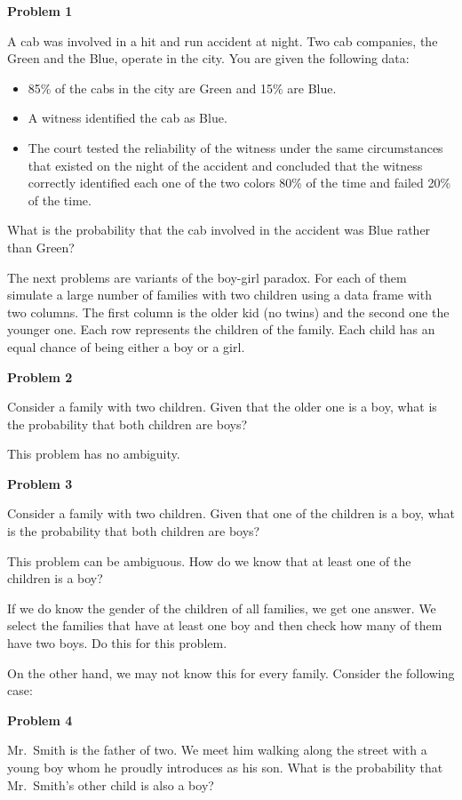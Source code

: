 \documentclass[
]{book}
\providecommand{\tightlist}{%
  \setlength{\itemsep}{0pt}\setlength{\parskip}{0pt}}
\theoremstyle{definition}
\theoremstyle{definition}
\theoremstyle{definition}
\theoremstyle{definition}
\theoremstyle{remark}
\begin{document}
\textbf{Problem 1}

A cab was involved in a hit and run accident at night. Two cab companies, the Green and the Blue, operate in the city. You are given the following data:

\begin{itemize}
\tightlist
\item
  85\% of the cabs in the city are Green and 15\% are Blue.
\item
  A witness identified the cab as Blue.
\item
  The court tested the reliability of the witness under the same circumstances that existed on the night of the accident and concluded that the witness correctly identified each one of the two colors 80\% of the time and failed 20\% of the time.
\end{itemize}

What is the probability that the cab involved in the accident was Blue rather than Green?

The next problems are variants of the boy-girl paradox. For each of them simulate a large number of families with two children using a data frame with two columns. The first column is the older kid (no twins) and the second one the younger one. Each row represents the children of the family. Each child has an equal chance of being either a boy or a girl.

\textbf{Problem 2}

Consider a family with two children. Given that the older one is a boy, what is the probability that both children are boys?

This problem has no ambiguity.

\textbf{Problem 3}

Consider a family with two children. Given that one of the children is a boy, what is the probability that both children are boys?

This problem can be ambiguous. How do we know that at least one of the children is a boy?

If we do know the gender of the children of all families, we get one answer. We select the families that have at least one boy and then check how many of them have two boys. Do this for this problem.

On the other hand, we may not know this for every family. Consider the following case:

\textbf{Problem 4}

Mr.~Smith is the father of two. We meet him walking along the street with a young boy whom he proudly introduces as his son. What is the probability that Mr.~Smith's other child is also a boy?
\end{document}
